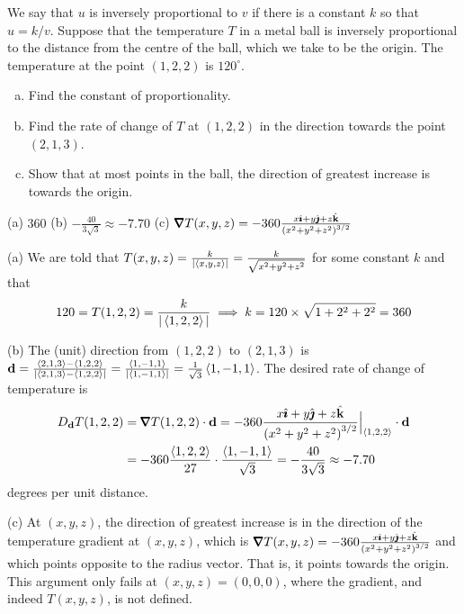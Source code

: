\begin{question}[M200 2000D] %
We say that $u$ is inversely proportional to $v$ if there
is a constant $k$ so that $u=k/v$. Suppose that the temperature $T$ in
a metal ball is inversely proportional to the distance from the centre
of the ball, which we take to be the origin. The temperature at the point
$(1,2,2)$ is $120^\circ$.
\begin{enumerate}[(a)]
\item
Find the constant of proportionality. 

\item
Find the rate of change of $T$ at $(1,2,2)$ in the direction
towards the point $(2,1,3)$.

\item
Show that at most points in the ball, the direction of greatest
increase is towards the origin.
\end{enumerate}
\end{question}

%

\begin{answer}
(a) $360$\qquad
(b) $-\frac{40}{3\sqrt{3}}\approx-7.70$\qquad
(c) $\vnabla T(x,y,z)=-360\frac{x\hi+y\hj+z\hk}{{(x^2+y^2+z^2)}^{3/2}}$
\end{answer}

\begin{solution}
(a)
We are told that $T(x,y,z)=\frac{k}{|\left< x,y,z\right>|}
=\frac{k}{\sqrt{x^2+y^2+z^2}}$ 
for some constant $k$ and that
\begin{equation*}
120=T(1,2,2)=\frac{k}{|\left< 1,2,2\right>|}
\implies k=120\times\sqrt{1+2^2+2^2}
          = 360
\end{equation*}

(b) The (unit) direction from $(1,2,2)$ to $(2,1,3)$
is $\mathbf{d}=\frac{\left< 2,1,3\right>-\left< 1,2,2\right>}{|\left< 2,1,3\right>-\left< 1,2,2\right>|}
=\frac{\left< 1,-1,1\right>}{|\left< 1,-1,1\right>|}=\frac{1}{\sqrt{3}}\left< 1,-1,1\right>$. 
The desired rate of change of temperature is
\begin{align*}
D_{\vd} T(1,2,2)
&=\vnabla T(1,2,2)\cdot\vd
=-360\frac{x\hi+y\hj+z\hk}{{(x^2+y^2+z^2)}^{3/2}}\Big|_{\llt 1,2,2\rgt}\cdot\vd
\\
&=-360\frac{\llt 1,2,2\rgt}{27}\cdot\frac{\llt 1,-1,1\rgt}{\sqrt{3}}
=-\frac{40}{3\sqrt{3}}\approx-7.70
\end{align*}
degrees per unit distance.

(c) At $(x,y,z)$, the direction of greatest increase is in the direction
of the temperature gradient at $(x,y,z)$, which is 
$\vnabla T(x,y,z)
=-360\frac{x\hi+y\hj+z\hk}{{(x^2+y^2+z^2)}^{3/2}}$
and which points opposite to the radius vector. That is, it points towards
the origin. This argument only fails at $(x,y,z)=(0,0,0)$, where the gradient,
and indeed $T(x,y,z)$, is not defined.
\end{solution}

